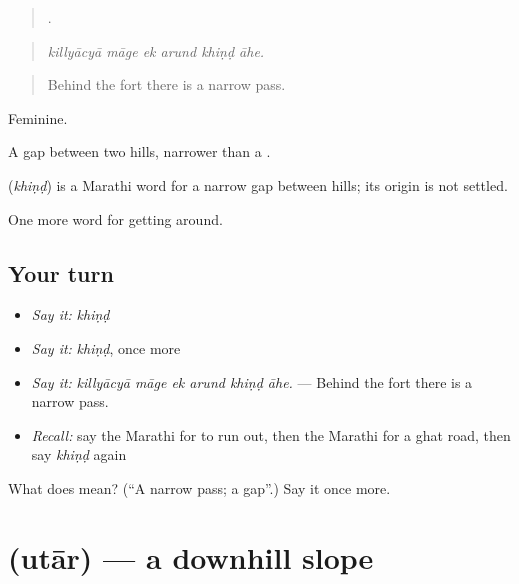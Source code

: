 \begin{quote}
     .
\end{quote}

\begin{quote}
\emph{killyācyā māge ek arund khiṇḍ āhe.}
\end{quote}

\begin{quote}
Behind the fort there is a narrow pass.
\end{quote}

Feminine.

A gap between two hills, narrower than a .

\begin{cousinweb}
\textbf{} (\emph{khiṇḍ}) is a Marathi word for a narrow gap between hills; its origin is not settled.
\end{cousinweb}

\begin{grammarlens}[title={What you've built}]
One more word for getting around.
\end{grammarlens}

\subsection*{Your turn}
\begin{itemize}
\raggedright
  \item \emph{Say it:} \emph{khiṇḍ}
  \item \emph{Say it:} \emph{khiṇḍ}, once more
  \item \emph{Say it:} \emph{killyācyā māge ek arund khiṇḍ āhe.} — Behind the fort there is a narrow pass.
  \item \emph{Recall:} say the Marathi for to run out, then the Marathi for a ghat road, then say \emph{khiṇḍ} again
\end{itemize}

\begin{tcolorbox}[breakable,colback=teal!4,colframe=teal!35!black,title={Before you move on}]
What does  mean? (\textquotedblleft{}A narrow pass; a gap\textquotedblright{}.) Say it once more.
\end{tcolorbox}
\section[\texorpdfstring{\mr{उतार} (utār)}{उतार (utār)}]{ (utār) — a downhill slope}

